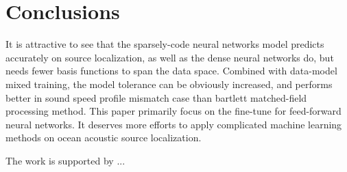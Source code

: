 \section{Conclusions}
It is attractive to see that the sparsely-code neural networks model predicts accurately on source localization,
as well as the dense neural networks do, but needs fewer basis functions to span the data space.
Combined with data-model mixed training, the model tolerance can be obviously increased,
and performs better in  sound speed profile mismatch case than bartlett matched-field processing method.
This paper primarily focus on the fine-tune for feed-forward neural networks.
It deserves more efforts to apply complicated machine learning methods on ocean
acoustic source localization.

\begin{acks}
The work is supported by ...

\end{acks}
